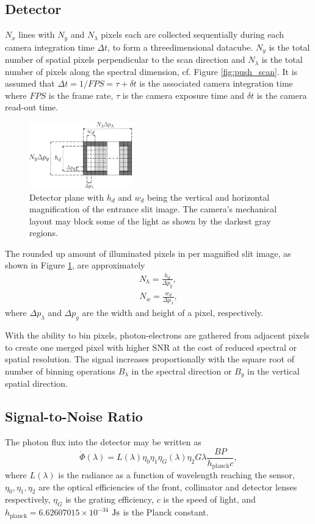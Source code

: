 \subsection{Detector}
 $N_x$ lines with $N_y$ and $N_\lambda$ pixels each are collected sequentially during each camera integration time $\Delta t$, to form a threedimensional datacube. $N_y$ is the total number of spatial pixels perpendicular to the scan direction and $N_{\lambda}$ is the total number of pixels along the spectral dimension, cf. Figure \ref{fig:push_scan}. It is assumed that $\Delta t=1/FPS=\tau +\delta t$ is the associated camera integration time where $FPS$ is the frame rate, $\tau$ is the camera exposure time and $\delta t$ is the camera read-out time.
\begin{figure}[htbp]
  \centering
      \includegraphics[width=0.4\textwidth]{figs/fad.png}
  \caption{Detector plane with $h_d$ and $w_d$ being the vertical and horizontal magnification of the entrance slit image. The camera's mechanical layout may block some of the light as shown by the darkest gray regions.}
	\label{fig:fad2}
\end{figure}
The rounded up amount of illuminated pixels in per magnified slit image, as shown in Figure \ref{fig:fad2}, are approximately
\begin{subequations}
\begin{align}
    N_{h} = \frac{h_d}{\Delta p_y}, \\
    N_{w} = \frac{w_d}{\Delta p_\lambda},
\end{align}
\end{subequations}
\noindent where $\Delta p_\lambda$ and $\Delta p_y$ are the width and height of a pixel, respectively.

With the ability to bin pixels, photon-electrons are gathered from adjacent pixels to create one merged pixel with higher SNR at the cost of reduced spectral or spatial resolution. The signal increases proportionally with the square root of number of binning operations $B_{\lambda}$ in the spectral direction or $B_{y}$ in the vertical spatial direction. 
\subsection{Signal-to-Noise Ratio}
The photon flux into the detector may be written as
\begin{equation}
\dot{\Phi}(\lambda) = L(\lambda)\eta_0 \eta_1 \eta_{G}(\lambda) \eta_2 G \lambda\frac{ BP}{h_{\text{planck}}c}, \label{eq:photons}
\end{equation}
\noindent where $L(\lambda)$ is the radiance as a function of wavelength reaching the sensor, $\eta_0, \eta_1, \eta_2$ are the optical efficiencies of the front, collimator and detector lenses respectively, $\eta_G$ is the grating efficiency, $c$ is the speed of light, and $h_{\text{planck}}=6.62607015\times10^{-34}$ $\rm{Js}$ is the Planck constant. 

